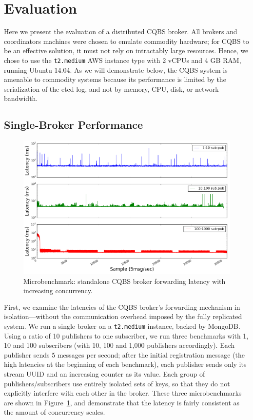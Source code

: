 \section{Evaluation}
\label{section:evaluation}

Here we present the evaluation of a distributed CQBS broker.
All brokers and coordinators machines were chosen to emulate commodity hardware; for CQBS to be an effective solution, it must not rely on intractably large resources.
Hence, we chose to use the \texttt{t2.medium} AWS instance type with 2 vCPUs and 4 GB RAM, running Ubuntu 14.04.
As we will demonstrate below, the CQBS system is amenable to commodity systems because its performance is limited by the serialization of the etcd log, and not by memory, CPU, disk, or network bandwidth.

\subsection{Single-Broker Performance}

\begin{figure}[t]
\centering
\includegraphics[width=\linewidth]{figs/singlenodelatency.png}
\caption{Microbenchmark: standalone CQBS broker forwarding latency with increasing concurrency.}
\label{fig:singlenodelatency}
\end{figure}

First, we examine the latencies of the CQBS broker's forwarding mechanism in isolation---without the communication overhead imposed by the fully replicated system.
We run a single broker on a \texttt{t2.medium} instance, backed by MongoDB\@.
Using a ratio of 10 publishers to one subscriber, we run three benchmarks with 1, 10 and 100 subscribers (with 10, 100 and 1,000 publishers accordingly).
Each publisher sends 5 messages per second; after the initial registration message (the high latencies at the beginning of each benchmark), each publisher sends only its stream UUID and an increasing counter as its value.
Each group of publishers/subscribers use entirely isolated sets of keys, so that they do not explicitly interfere with each other in the broker.
These three microbenchmarks are shown in Figure~\ref{fig:singlenodelatency}, and demonstrate that the latency is fairly consistent as the amount of concurrency scales.

